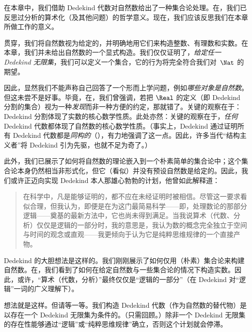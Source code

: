 \documentclass[../../../include/open-logic-section]{subfiles}
\begin{document}


在本章中，我们借助 Dedekind 代数对自然数给出了一种集合论处理。在，我们已反思过分析的算术化（及其他问题）的哲学意义。现在，我们应该反思我们在本章所做工作的意义。

贯穿，我们将自然数视为给定的，并明确地用它们来构造整数、有理数和实数。在本章，我们并未给出自然数的一个显式构造。我们仅仅证明了，\emph{给定任一 Dedekind 无限集}，我们可以定义一个集合，它的行为将完全符合我们对~$\Nat$ 的期望。

因此，显然我们不能声称自己回答了一个形而上学问题，例如\emph{哪些对象是自然数}。但这未尝不是好事。毕竟，在，我们曾强调，若把 $\Real$ 的定义（即 Dedekind 分割的集合）视为一种\emph{发现}而非一种方便的约定，那就错了。关键的观察在于：Dedekind 分割体现了实数的核心数学性质。此处亦然：关键的观察在于，\emph{任何} Dedekind 代数都体现了自然数的核心数学性质。（事实上，Dedekind 通过证明所有 Dedekind 代数都是\emph{同构的}（\citeyear[定理 132--3]{Dedekind1888}），有力地强调了这一点。因此，许多当代“结构主义者”将 Dedekind 引为先驱，也就不足为奇了。）

此外，我们已展示了如何将自然数的理论嵌入到一个朴素简单的集合论中；这个集合论本身仍然相当非形式化，但它（看似）并没有预设自然数是给定的。因此，我们或许正迈向实现 Dedekind 本人那雄心勃勃的计划，他曾如此解释道：

\begin{quote}
	在科学中，凡是能够证明的，都不应在未经证明时被相信。尽管这一要求看似合理，但我认为，即便是在为这门最简易科学——即，处理数论的那部分逻辑——奠基的最新方法中，它也尚未得到满足。当我说算术（代数、分析）仅仅是逻辑的一部分时，我的意思是，我认为数的概念完全独立于空间与时间的观念或直观——我更倾向于认为它是纯粹思维规律的一个直接产物。\citep[前言]{Dedekind1888}
\end{quote}

Dedekind 的大胆想法是这样的。我们刚刚展示了如何仅用（朴素）集合论来构建自然数。在，我们看到了如何在给定自然数与一些集合论的情况下构造实数。因此，或许，“算术（代数，分析）”最终仅仅是“逻辑的一部分”（在 Dedekind 对“逻辑”一词的广义理解下）。

想法就是这样。但请等一等。我们构造 Dedekind 代数（作为自然数的替代物）是以存在一个 Dedekind 无限集为条件的。（只需回顾。）除非一个 Dedekind 无限集的存在性能够通过“逻辑”或“纯粹思维规律”确立，否则这个计划就会停滞。
\end{document}

